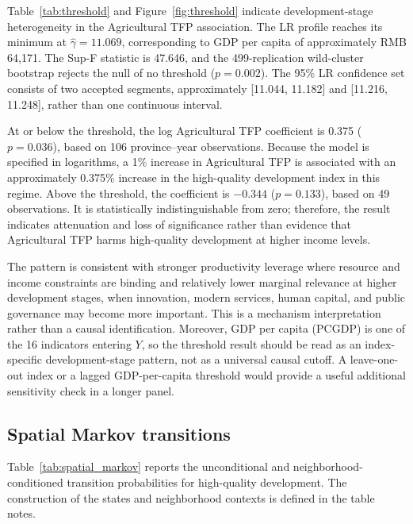 \documentclass[sustainability,article,submit,moreauthors]{Definitions/mdpi}
\numberwithin{equation}{section}
\begin{document}
Table~\ref{tab:threshold} and Figure~\ref{fig:threshold} indicate
development-stage heterogeneity in the Agricultural TFP association. The LR
profile reaches its minimum at $\widehat\gamma=11.069$, corresponding to GDP
per capita of approximately RMB 64,171. The Sup-F statistic is 47.646, and the
499-replication wild-cluster bootstrap rejects the null of no threshold
($p=0.002$). The 95\% LR confidence set consists of two accepted segments,
approximately [11.044, 11.182] and [11.216, 11.248], rather than one
continuous interval.

At or below the threshold, the log Agricultural TFP coefficient is 0.375
($p=0.036$), based on 106 province--year observations. Because the model is
specified in logarithms, a 1\% increase in Agricultural TFP is associated with
an approximately 0.375\% increase in the high-quality development index in
this regime. Above the threshold, the coefficient is $-0.344$ ($p=0.133$),
based on 49 observations. It is statistically indistinguishable from zero;
therefore, the result indicates attenuation and loss of significance rather
than evidence that Agricultural TFP harms high-quality development at higher
income levels.

The pattern is consistent with stronger productivity leverage where resource
and income constraints are binding and relatively lower marginal relevance at
higher development stages, when innovation, modern services, human capital,
and public governance may become more important. This is a mechanism
interpretation rather than a causal identification. Moreover, GDP per capita
(PCGDP) is one of the 16 indicators entering $Y$, so the threshold result
should be read as an index-specific development-stage pattern, not as a
universal causal cutoff. A leave-one-out index or a lagged GDP-per-capita
threshold would provide a useful additional sensitivity check in a longer
panel.

\FloatBarrier
\subsection{Spatial Markov transitions}

Table~\ref{tab:spatial_markov} reports the unconditional and
neighborhood-conditioned transition probabilities for high-quality
development. The construction of the states and neighborhood contexts is
defined in the table notes.
\end{document}
